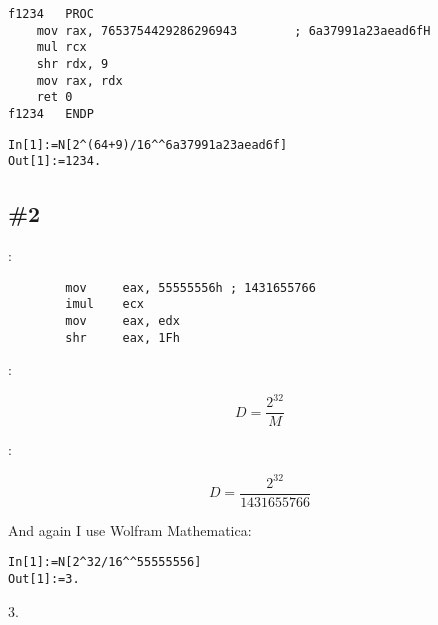 \begin{lstlisting}[caption=MSVC 2012 x64 /Ox]
f1234	PROC
	mov	rax, 7653754429286296943		; 6a37991a23aead6fH
	mul	rcx
	shr	rdx, 9
	mov	rax, rdx
	ret	0
f1234	ENDP
\end{lstlisting}

\begin{lstlisting}[caption=Wolfram Mathematica]
In[1]:=N[2^(64+9)/16^^6a37991a23aead6f]
Out[1]:=1234.
\end{lstlisting}

\subsection{ \#2}

:

\begin{lstlisting}
		mov     eax, 55555556h ; 1431655766
		imul    ecx
		mov     eax, edx
		shr     eax, 1Fh
\end{lstlisting}

:

\[
D=\frac{2^{32}}{M}
\]

:

\[
D=\frac{2^{32}}{1431655766}
\]

{And again I use} Wolfram Mathematica:

\begin{lstlisting}[caption=Wolfram Mathematica]
In[1]:=N[2^32/16^^55555556]
Out[1]:=3.
\end{lstlisting}

 3.


